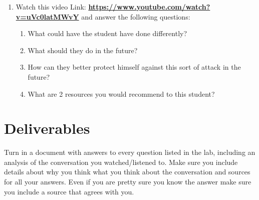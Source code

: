 \documentclass[12pt]{article}
\begin{document}
\begin{enumerate}
\begin{itemize}
            \item 1 should be strangers you don't know
            \item 1 can be of either variety
        \end{itemize}
        For each of the 3 conversations please take notes starting with the following questions:
        \begin{itemize}
            \item Was it a happy conversation? Sad? Tense?
            \item What led you to that conclusion?
            \item Who was dominant during the conversation?
            \item  What was the body language? Did dominance switch?
            \item What body language did you see happening?
            \item Could you see facial expressions? What did you see? What do you think those expressions mean?
        \end{itemize}
    
        
        \item Watch this video  Link: \href{https://www.youtube.com/watch?v=uVc0latMWvY}{\textbf{https://www.youtube.com/watch?v=uVc0latMWvY}}    and answer the following questions:
        \begin{enumerate}
            \item What could have the student have done differently?
            \item What should they do in the future?
            \item How can they better protect himself against this sort of attack in the future?
            \item What are 2 resources you would recommend to this student?
        \end{enumerate}
          
        
    \end{enumerate}



\section*{Deliverables}
Turn in a document with answers to every question listed in the lab, including an analysis of the conversation you watched/listened to. Make sure you include details about why you think what you think about the conversation and sources for all your answers.  Even if you are pretty sure you know the answer make sure you include a source that agrees with you.
\end{document}
